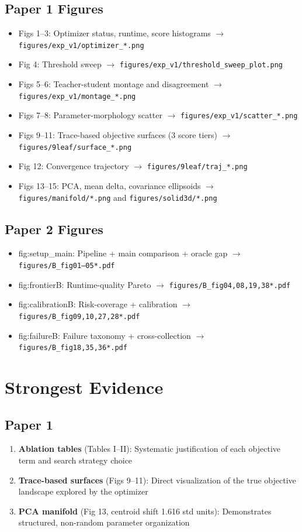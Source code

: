 \documentclass[11pt,a4paper]{article}
\begin{document}
\subsection{Paper 1 Figures}
\begin{itemize}
\item Figs 1--3: Optimizer status, runtime, score histograms $\rightarrow$ \texttt{figures/exp\_v1/optimizer\_*.png}
\item Fig 4: Threshold sweep $\rightarrow$ \texttt{figures/exp\_v1/threshold\_sweep\_plot.png}
\item Figs 5--6: Teacher-student montage and disagreement $\rightarrow$ \texttt{figures/exp\_v1/montage\_*.png}
\item Figs 7--8: Parameter-morphology scatter $\rightarrow$ \texttt{figures/exp\_v1/scatter\_*.png}
\item Figs 9--11: Trace-based objective surfaces (3 score tiers) $\rightarrow$ \texttt{figures/9leaf/surface\_*.png}
\item Fig 12: Convergence trajectory $\rightarrow$ \texttt{figures/9leaf/traj\_*.png}
\item Figs 13--15: PCA, mean delta, covariance ellipsoids $\rightarrow$ \texttt{figures/manifold/*.png} and \texttt{figures/solid3d/*.png}
\end{itemize}

\subsection{Paper 2 Figures}
\begin{itemize}
\item fig:setup\_main: Pipeline + main comparison + oracle gap $\rightarrow$ \texttt{figures/B\_fig01--05*.pdf}
\item fig:frontierB: Runtime-quality Pareto $\rightarrow$ \texttt{figures/B\_fig04,08,19,38*.pdf}
\item fig:calibrationB: Risk-coverage + calibration $\rightarrow$ \texttt{figures/B\_fig09,10,27,28*.pdf}
\item fig:failureB: Failure taxonomy + cross-collection $\rightarrow$ \texttt{figures/B\_fig18,35,36*.pdf}
\end{itemize}

\section{Strongest Evidence}

\subsection{Paper 1}
\begin{enumerate}
\item \textbf{Ablation tables} (Tables I--II): Systematic justification of each objective term and search strategy choice
\item \textbf{Trace-based surfaces} (Figs 9--11): Direct visualization of the true objective landscape explored by the optimizer
\item \textbf{PCA manifold} (Fig 13, centroid shift 1.616 std units): Demonstrates structured, non-random parameter organization
\end{enumerate}
\end{document}
